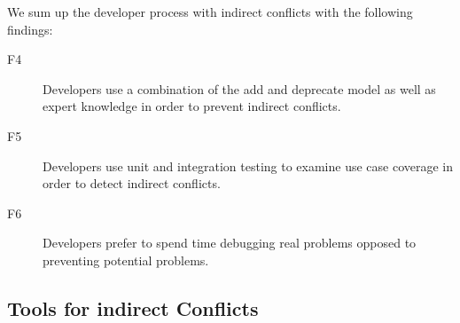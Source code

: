 \documentclass[conference]{IEEEtran}
\makeatletter
\def\namedlabel#1#2{\begingroup
   \def\@currentlabel{#2}%
   \label{#1}\endgroup
}
\makeatother
\begin{document}
We sum up the developer process with indirect conflicts with the following findings:
\begin{description}
	\item[F4\namedlabel{itm:f4}{F4}] Developers use a combination of the add and deprecate model as well as expert 
																	 knowledge in order to prevent indirect conflicts.
	\item[F5\namedlabel{itm:f5}{F5}] Developers use unit and integration testing to examine use case coverage in order to detect indirect conflicts.
	\item[F6\namedlabel{itm:f6}{F6}] Developers prefer to spend time debugging real problems opposed to preventing potential problems.
\end{description}

\subsection{Tools for indirect Conflicts}
\label{sec:td}
\end{document}
